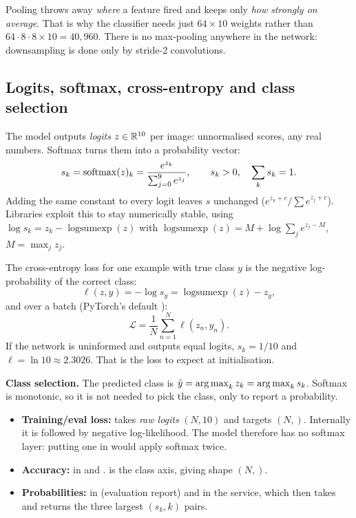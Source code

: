 \begin{repo}
Pooling throws away \emph{where} a feature fired and keeps only \emph{how strongly on average}. That is why the classifier needs just $64\times10$ weights rather than $64\cdot8\cdot8\times10 = 40{,}960$. There is no max-pooling anywhere in the network: downsampling is done only by stride-2 convolutions.
\end{repo}

\subsection{Logits, softmax, cross-entropy and class selection}
\label{sec:ce}

\begin{idea}
The model outputs \emph{logits} $z\in\mathbb{R}^{10}$ per image: unnormalised scores, any real numbers. Softmax turns them into a probability vector:
\[
  s_k = \operatorname{softmax}(z)_k = \frac{e^{z_k}}{\sum_{j=0}^{9} e^{z_j}}, \qquad s_k>0,\quad \sum_k s_k = 1 .
\]
Adding the same constant to every logit leaves $s$ unchanged ($e^{z_k+c}/\sum e^{z_j+c}$). Libraries exploit this to stay numerically stable, using $\log s_k = z_k - \operatorname{logsumexp}(z)$ with $\operatorname{logsumexp}(z) = M + \log\sum_j e^{z_j-M}$, $M=\max_j z_j$.

The cross-entropy loss for one example with true class $y$ is the negative log-probability of the correct class:
\[
  \ell(z,y) = -\log s_y = \operatorname{logsumexp}(z) - z_y ,
\]
and over a batch (PyTorch's default ):
\[
  \mathcal L = \frac1N\sum_{n=1}^{N}\ell(z_n,y_n).
\]
If the network is uninformed and outputs equal logits, $s_k = 1/10$ and $\ell = \ln 10 \approx 2.3026$. That is the loss to expect at initialisation.

\textbf{Class selection.} The predicted class is $\hat y = \operatorname*{arg\,max}_k z_k = \operatorname*{arg\,max}_k s_k$. Softmax is monotonic, so it is not needed to pick the class, only to report a probability.
\end{idea}

\begin{repo}
\begin{itemize}[nosep]
  \item \textbf{Training/eval loss:}  takes \emph{raw logits} $(N,10)$ and  targets $(N,)$. Internally it is  followed by negative log-likelihood. The model therefore has no softmax layer: putting one in would apply softmax twice.
  \item \textbf{Accuracy:}  in  and .  is the class axis, giving shape $(N,)$.
  \item \textbf{Probabilities:}  in  (evaluation report) and in the service, which then takes  and returns the three largest $(s_k, k)$ pairs.
\end{itemize}
\end{repo}
